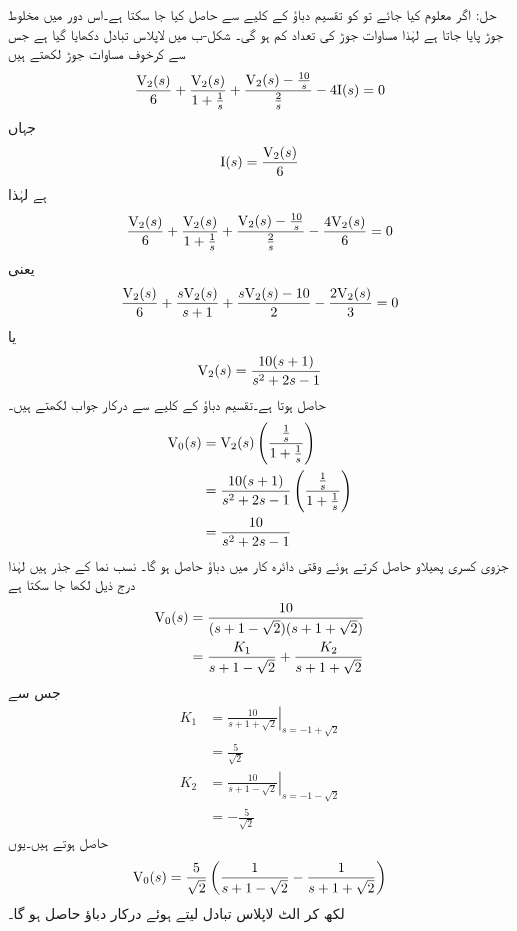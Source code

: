 حل: اگر  معلوم کیا جائے تو  کو تقسیم دباؤ کے کلیے سے حاصل کیا جا سکتا ہے۔اس دور میں مخلوط جوڑ پایا جاتا ہے لہٰذا مساوات جوڑ کی تعداد کم ہو گی۔ شکل-ب میں لاپلاس تبادل  دکھایا گیا ہے جس سے کرخوف مساوات جوڑ لکھتے ہیں
\begin{align*}
\frac{{{\textup{V}}}_2(s)}{6}+\frac{{{\textup{V}}}_2(s)}{1+\frac{1}{s}}+\frac{{{\textup{V}}}_2(s)-\frac{10}{s}}{\frac{2}{s}}-4{{\textup{I}}}(s)=0
\end{align*}
جہاں
\begin{align*}
{\ensuremath{{\textup{I}}}}(s)=\frac{{{\textup{V}}}_2(s)}{6}
\end{align*}
ہے لہٰذا
\begin{align*}
\frac{{{\textup{V}}}_2(s)}{6}+\frac{{{\textup{V}}}_2(s)}{1+\frac{1}{s}}+\frac{{{\textup{V}}}_2(s)-\frac{10}{s}}{\frac{2}{s}}-\frac{4{{\textup{V}}}_2(s)}{6}=0
\end{align*}
یعنی
\begin{align*}
\frac{{{\textup{V}}}_2(s)}{6}+\frac{s{{\textup{V}}}_2(s)}{s+1}+\frac{s{{\textup{V}}}_2(s)-10}{2}-\frac{2{{\textup{V}}}_2(s)}{3}=0
\end{align*}
یا
\begin{align*}
{\ensuremath{{\textup{V}}}}_2(s)=\frac{10(s+1)}{s^2+2s-1}
\end{align*}
حاصل ہوتا ہے۔تقسیم دباؤ کے کلیے سے درکار جواب لکھتے ہیں۔
\begin{align*}
{\ensuremath{{\textup{V}}}}_0(s)&={{\textup{V}}}_2(s)\left(\frac{\frac{1}{s}}{1+\frac{1}{s}}\right)\\
&=\frac{10(s+1)}{s^2+2s-1}\left(\frac{\frac{1}{s}}{1+\frac{1}{s}}\right)\\
&=\frac{10}{s^2+2s-1}
\end{align*}
جزوی کسری پھیلاو حاصل کرتے ہوئے  وقتی دائرہ کار میں دباؤ حاصل ہو گا۔  نسب نما کے جذر  ہیں لہٰذا درج ذیل لکھا جا سکتا ہے
\begin{align*}
{\ensuremath{{\textup{V}}}}_0(s)&=\frac{10}{(s+1-\sqrt{2})(s+1+\sqrt{2})}\\
&=\frac{K_1}{s+1-\sqrt{2}}+\frac{K_2}{s+1+\sqrt{2}}
\end{align*}
جس سے 
\begin{align*}
K_1&=\left.\frac{10}{s+1+\sqrt{2}} \right|_{s=-1+\sqrt{2}}\\
&=\frac{5}{\sqrt{2}}\\
K_2&=\left.\frac{10}{s+1-\sqrt{2}} \right|_{s=-1-\sqrt{2}}\\
&=-\frac{5}{\sqrt{2}}
\end{align*}
حاصل ہوتے ہیں۔یوں
\begin{align*}
{\ensuremath{{\textup{V}}}}_0(s)=\frac{5}{\sqrt{2}}\left(\frac{1}{s+1-\sqrt{2}}-\frac{1}{s+1+\sqrt{2}}\right)
\end{align*}
لکھ کر الٹ لاپلاس تبادل لیتے ہوئے درکار دباؤ حاصل ہو گا۔
